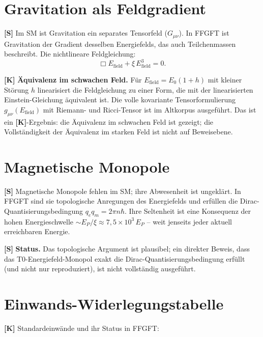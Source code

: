\section{Gravitation als Feldgradient}

\textbf{[S]} Im SM ist Gravitation ein separates Tensorfeld ($G_{\mu\nu}$). In FFGFT
ist Gravitation der Gradient desselben Energiefelds, das auch Teilchenmassen beschreibt.
Die nichtlineare Feldgleichung:
\[
  \Box E_\text{field} + \xi\,E_\text{field}^3 = 0.
\]

\textbf{[K]} \textbf{Äquivalenz im schwachen Feld.} Für $E_\text{field}=E_0(1+h)$
mit kleiner Störung $h$ linearisiert die Feldgleichung zu einer Form, die mit der
linearisierten Einstein-Gleichung äquivalent ist. Die volle kovariante Tensorformulierung
$g_{\mu\nu}(E_\text{field})$ mit Riemann- und Ricci-Tensor ist im Altkorpus
ausgeführt. Das ist ein \textbf{[K]}-Ergebnis: die Äquivalenz im schwachen Feld ist
gezeigt; die Vollständigkeit der Äquivalenz im starken Feld ist nicht auf
Beweisebene.

\section{Magnetische Monopole}

\textbf{[S]} Magnetische Monopole fehlen im SM; ihre Abwesenheit ist ungeklärt. In FFGFT
sind sie topologische Anregungen des Energiefelds und erfüllen die
Dirac-Quantisierungsbedingung $q_e q_m = 2\pi n\hbar$. Ihre Seltenheit ist eine
Konsequenz der hohen Energieschwelle $\sim E_P/\xi\approx7{,}5\times10^3\,E_P$
-- weit jenseits jeder aktuell erreichbaren Energie.

\textbf{[S]} \textbf{Status.} Das topologische Argument ist plausibel; ein direkter
Beweis, dass das T0-Energiefeld-Monopol exakt die Dirac-Quantisierungsbedingung
erfüllt (und nicht nur reproduziert), ist nicht vollständig ausgeführt.

\section{Einwands-Widerlegungstabelle}

\textbf{[K]} Standardeinwände und ihr Status in FFGFT:

